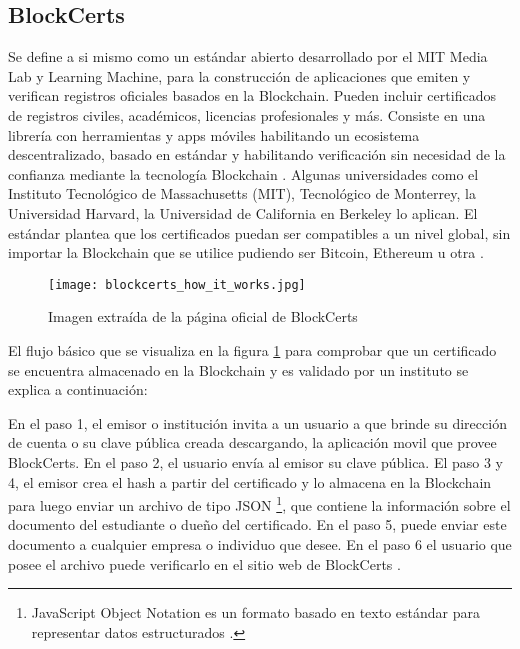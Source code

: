 \subsection{BlockCerts}
Se define a si mismo 
como un estándar abierto   desarrollado por el MIT Media Lab y Learning Machine, para la construcción  de  aplicaciones que emiten y verifican registros oficiales basados
en la Blockchain. Pueden incluir certificados de registros civiles, académicos, licencias profesionales y más. 
Consiste en una librería con herramientas y apps móviles habilitando un ecosistema descentralizado, basado en estándar y habilitando verificación sin necesidad de la confianza mediante la tecnología  Blockchain \cite[]{blockcerts_introduction_nodate}.
Algunas universidades como el Instituto Tecnológico de Massachusetts (MIT), Tecnológico de Monterrey, la Universidad Harvard, la Universidad de California en Berkeley lo aplican. El 
estándar plantea que los certificados puedan ser compatibles a un nivel global, sin importar
la  Blockchain que se utilice pudiendo ser Bitcoin, Ethereum u otra \cite[]{edublocs_nueve_2019,criptomonedas_tv_entrevista_2018}. 

\begin{figure}[H]
  \centering
  {\texttt{[image: blockcerts\_how\_it\_works.jpg]}}
  \caption{Imagen extraída de la página oficial de BlockCerts}
  \label{img:blockcerts_how_it_works}
\end{figure}

El flujo básico que se visualiza en  la figura \ref{img:blockcerts_how_it_works}   para comprobar que
un certificado se encuentra almacenado en la  Blockchain y es validado por un instituto se explica a continuación:

En el paso 1, el emisor o institución invita a un usuario a que brinde su dirección de cuenta o su clave pública creada 
descargando, la aplicación movil que provee BlockCerts. En el paso 2, el usuario envía al emisor su clave pública.
El paso 3 y 4, el emisor crea el hash a partir del certificado y lo almacena en la  Blockchain para luego enviar un archivo de tipo JSON 
\footnote{JavaScript Object Notation es un formato basado en texto estándar para representar datos estructurados \cite[]{mozilla_trabajando_json}.}, que contiene
la información sobre el documento del estudiante o dueño del certificado. En el paso 5, puede enviar este documento a cualquier empresa o individuo que desee.
 En el paso 6 el usuario que posee el archivo puede verificarlo en el sitio web de  BlockCerts \cite[]{blockcerts_introduction_nodate}.

 